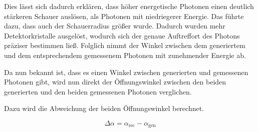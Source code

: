 \documentclass[a4paper,11pt,oneside,final,german,openbib,pdftex]{scrbook}
\begin{document}
{Dies l\"asst sich dadurch erkl\"aren, dass h\"oher energetische Photonen einen deutlich st\"arkeren Schauer ausl\"osen, als Photonen mit niedriegerer Energie. Das f\"uhrte dazu, dass auch der Schauerradius gr\"o{\ss}er wurde. Dadurch wurden mehr Detektorkristalle ausgel\"ost, wodurch sich der genaue Auftreffort des Photons pr\"aziser bestimmen lie{\ss}. Folglich nimmt der Winkel zwischen dem generiertem und dem entsprechendem gemessenem Photonen mit zunehmender Energie ab.

Da nun bekannt ist, dass es einen Winkel zwischen generierten und gemessenen Photonen gibt, wird nun direkt der \"Offnungswinkel zwischen den beiden generierten und den beiden gemessenen Photonen verglichen.

Dazu wird die Abweichung der beiden \"Offnungswinkel berechnet.

\begin{equation}
	\Delta\alpha = \alpha_{\text{rec}} - \alpha_{\text{gen}}
\end{equation}


}
\end{document}
